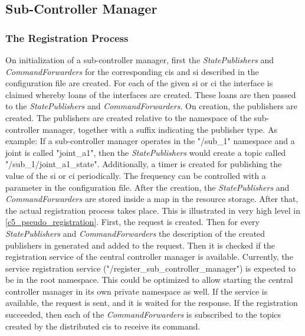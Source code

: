 \subsection{Sub-Controller Manager}
\subsubsection{The Registration Process}\label{c5_registration_sub_controller}
On initialization of a sub-controller manager, first the \textit{StatePublishers} and \textit{CommandForwarders} for the corresponding \glspl{ci} and \gls{si} described in the configuration file are created. For each of the given \gls{si} or \gls{ci} the interface is claimed whereby loans of the interfaces are created. These loans are then passed to the \textit{StatePublishers} and \textit{CommandForwarders}. On creation, the publishers are created. The publishers are created relative to the namespace of the sub-controller manager, together with a suffix indicating the publisher type. As example: If a sub-controller manager operates in the "/sub\_1" namespace and a joint is called "joint\_a1", then the \textit{StatePublishers} would create a topic called "/sub\_1/joint\_a1\_state".\newline
Additionally, a timer is created for publishing the value of the \gls{si} or \gls{ci} periodically. The frequency can be controlled with a parameter in the configuration file. After the creation, the \textit{StatePublishers} and \textit{CommandForwarders} are stored inside a map in the resource storage. \newline
After that, the actual registration process takes place. This is illustrated in very high level in \autoref{c5_pseudo_registration}. First, the request is created. Then for every \textit{StatePublishers} and \textit{CommandForwarders} the description of the created publishers in generated and added to the request. Then it is checked if the registration service of the central controller manager is available. Currently, the service registration service ("/register\_sub\_controller\_manager") is expected to be in the root namespace. This could be optimized to allow starting the central controller manager in its own private namespace as well. If the service is available, the request is sent, and it is waited for the response. If the registration succeeded, then each of the \textit{CommandForwarders} is subscribed to the topics created by the distributed \glspl{ci} to receive its command.
